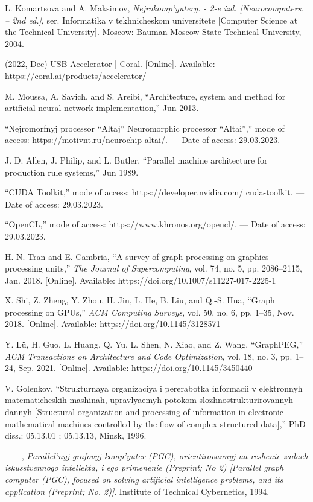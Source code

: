 \documentclass{article}
\begin{document}
{\begin{multicols}{2}
{\begin{enumerate}[label={[\arabic*]}]
    \item L. Komartsova and A. Maksimov, \textit{Nejrokomp’yutery. - 2-e izd.
[Neurocomputers. – 2nd ed.]}, ser. Informatika v tekhnicheskom
universitete [Computer Science at the Technical University].
Moscow: Bauman Moscow State Technical University, 2004.
    \item (2022, Dec) USB Accelerator | Coral. [Online]. Available:
https://coral.ai/products/accelerator/
    \item M. Moussa, A. Savich, and S. Areibi, “Architecture, system and
method for artificial neural network implementation,” Jun 2013.
    \item “Nejromorfnyj processor “Altaj” Neuromorphic processor “Altai”,”
mode of access: https://motivnt.ru/neurochip-altai/. — Date of
access: 29.03.2023.
    \item J. D. Allen, J. Philip, and L. Butler, “Parallel machine architecture
for production rule systems,” Jun 1989.
    \item “CUDA Toolkit,” mode of access: https://developer.nvidia.com/
cuda-toolkit. — Date of access: 29.03.2023.

    \item “OpenCL,” mode of access: https://www.khronos.org/opencl/. —
Date of access: 29.03.2023.
    \item H.-N. Tran and E. Cambria, “A survey of graph processing
on graphics processing units,” \textit{The Journal of Supercomputing},
vol. 74, no. 5, pp. 2086–2115, Jan. 2018. [Online]. Available:
https://doi.org/10.1007/s11227-017-2225-1

    \item X. Shi, Z. Zheng, Y. Zhou, H. Jin, L. He, B. Liu, and
Q.-S. Hua, “Graph processing on GPUs,” \textit{ACM Computing
Surveys}, vol. 50, no. 6, pp. 1–35, Nov. 2018. [Online]. Available:
https://doi.org/10.1145/3128571

    \item Y. Lü, H. Guo, L. Huang, Q. Yu, L. Shen, N. Xiao, and
Z. Wang, “GraphPEG,” \textit{ACM Transactions on Architecture and
Code Optimization}, vol. 18, no. 3, pp. 1–24, Sep. 2021. [Online].
Available: https://doi.org/10.1145/3450440
    \item V. Golenkov, “Strukturnaya organizaciya i pererabotka informacii
v elektronnyh matematicheskih mashinah, upravlyaemyh potokom
slozhnostrukturirovannyh dannyh [Structural organization and
processing of information in electronic mathematical machines
controlled by the flow of complex structured data],” PhD diss.:
05.13.01 ; 05.13.13, Minsk, 1996.
    \item ——, \textit{Parallel’nyj grafovyj komp’yuter (PGC), orientirovannyj
na reshenie zadach iskusstvennogo intellekta, i ego primenenie
(Preprint; No 2) [Parallel graph computer (PGC), focused
on solving artificial intelligence problems, and its application
(Preprint; No. 2)]}. Institute of Technical Cybernetics, 1994.


\end{enumerate}}
\end{multicols}}
\end{document}
